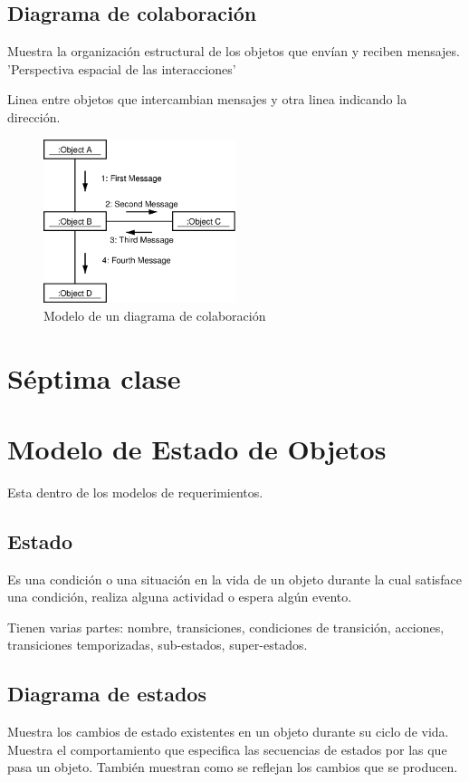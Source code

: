 \documentclass[titlepage,a4paper]{article}
\begin{document}
\subsection{Diagrama de colaboración}
Muestra la organización estructural de los objetos que envían y reciben mensajes. 'Perspectiva espacial de las interacciones'

Linea entre objetos que intercambian mensajes y otra linea indicando la dirección.

\begin{figure}[!htb]
    \centering
    \includegraphics[width=0.5\textwidth]{Imagenes/CollaborationDiagram.png}
    \caption{Modelo de un diagrama de colaboración}
\end{figure}

\newpage

\section*{Séptima clase}
\section{Modelo de Estado de Objetos}
Esta dentro de los modelos de requerimientos.

\subsection{Estado}
Es una condición o una situación en la vida de un objeto durante la cual satisface una condición, realiza alguna actividad o espera algún evento.

Tienen varias partes: nombre, transiciones, condiciones de transición, acciones, transiciones temporizadas, sub-estados, super-estados.

\subsection{Diagrama de estados}
Muestra los cambios de estado existentes en un objeto durante su ciclo de vida. Muestra el comportamiento que especifica las secuencias de estados por las que pasa un objeto. También muestran como se reflejan los cambios que se producen.
\end{document}

